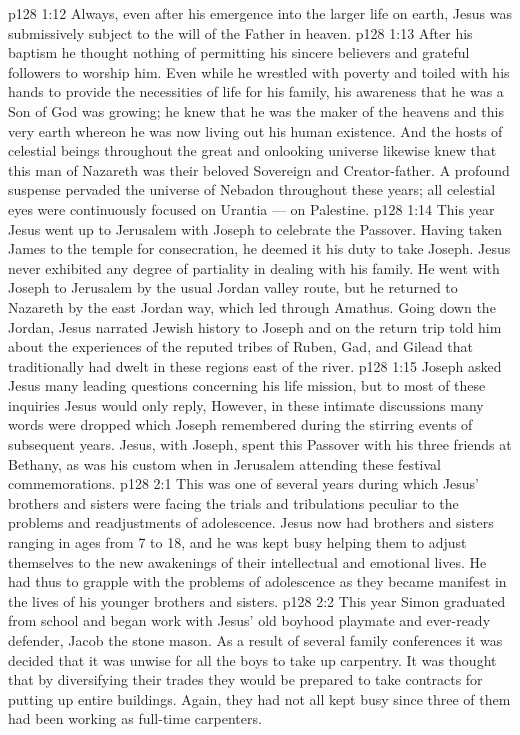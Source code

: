 \vs p128 1:12 Always, even after his emergence into the larger life on earth, Jesus was submissively subject to the will of the Father in heaven.
\vs p128 1:13 After his baptism he thought nothing of permitting his sincere believers and grateful followers to worship him. Even while he wrestled with poverty and toiled with his hands to provide the necessities of life for his family, his awareness that he was a Son of God was growing; he knew that he was the maker of the heavens and this very earth whereon he was now living out his human existence. And the hosts of celestial beings throughout the great and onlooking universe likewise knew that this man of Nazareth was their beloved Sovereign and Creator\hyp{}father. A profound suspense pervaded the universe of Nebadon throughout these years; all celestial eyes were continuously focused on Urantia --- on Palestine.
\vs p128 1:14 \pc This year Jesus went up to Jerusalem with Joseph to celebrate the Passover. Having taken James to the temple for consecration, he deemed it his duty to take Joseph. Jesus never exhibited any degree of partiality in dealing with his family. He went with Joseph to Jerusalem by the usual Jordan valley route, but he returned to Nazareth by the east Jordan way, which led through Amathus. Going down the Jordan, Jesus narrated Jewish history to Joseph and on the return trip told him about the experiences of the reputed tribes of Ruben, Gad, and Gilead that traditionally had dwelt in these regions east of the river.
\vs p128 1:15 Joseph asked Jesus many leading questions concerning his life mission, but to most of these inquiries Jesus would only reply,  However, in these intimate discussions many words were dropped which Joseph remembered during the stirring events of subsequent years. Jesus, with Joseph, spent this Passover with his three friends at Bethany, as was his custom when in Jerusalem attending these festival commemorations.
\vs p128 2:1 This was one of several years during which Jesus’ brothers and sisters were facing the trials and tribulations peculiar to the problems and readjustments of adolescence. Jesus now had brothers and sisters ranging in ages from 7 to 18, and he was kept busy helping them to adjust themselves to the new awakenings of their intellectual and emotional lives. He had thus to grapple with the problems of adolescence as they became manifest in the lives of his younger brothers and sisters.
\vs p128 2:2 This year Simon graduated from school and began work with Jesus’ old boyhood playmate and ever\hyp{}ready defender, Jacob the stone mason. As a result of several family conferences it was decided that it was unwise for all the boys to take up carpentry. It was thought that by diversifying their trades they would be prepared to take contracts for putting up entire buildings. Again, they had not all kept busy since three of them had been working as full\hyp{}time carpenters.
